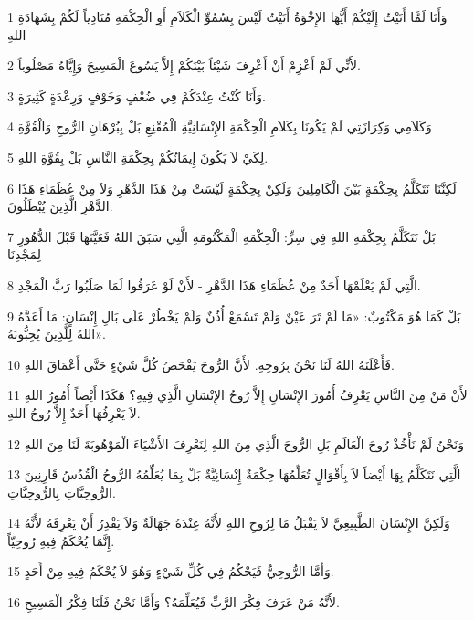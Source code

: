 \par 1 وَأَنَا لَمَّا أَتَيْتُ إِلَيْكُمْ أَيُّهَا الإِخْوَةُ أَتَيْتُ لَيْسَ بِسُمُوِّ الْكَلاَمِ أَوِ الْحِكْمَةِ مُنَادِياً لَكُمْ بِشَهَادَةِ اللهِ
\par 2 لأَنِّي لَمْ أَعْزِمْ أَنْ أَعْرِفَ شَيْئاً بَيْنَكُمْ إِلاَّ يَسُوعَ الْمَسِيحَ وَإِيَّاهُ مَصْلُوباً.
\par 3 وَأَنَا كُنْتُ عِنْدَكُمْ فِي ضُعْفٍ وَخَوْفٍ وَرِعْدَةٍ كَثِيرَةٍ.
\par 4 وَكَلاَمِي وَكِرَازَتِي لَمْ يَكُونَا بِكَلاَمِ الْحِكْمَةِ الإِنْسَانِيَّةِ الْمُقْنِعِ بَلْ بِبُرْهَانِ الرُّوحِ وَالْقُوَّةِ
\par 5 لِكَيْ لاَ يَكُونَ إِيمَانُكُمْ بِحِكْمَةِ النَّاسِ بَلْ بِقُوَّةِ اللهِ.
\par 6 لَكِنَّنَا نَتَكَلَّمُ بِحِكْمَةٍ بَيْنَ الْكَامِلِينَ وَلَكِنْ بِحِكْمَةٍ لَيْسَتْ مِنْ هَذَا الدَّهْرِ وَلاَ مِنْ عُظَمَاءِ هَذَا الدَّهْرِ الَّذِينَ يُبْطَلُونَ.
\par 7 بَلْ نَتَكَلَّمُ بِحِكْمَةِ اللهِ فِي سِرٍّ: الْحِكْمَةِ الْمَكْتُومَةِ الَّتِي سَبَقَ اللهُ فَعَيَّنَهَا قَبْلَ الدُّهُورِ لِمَجْدِنَا
\par 8 الَّتِي لَمْ يَعْلَمْهَا أَحَدٌ مِنْ عُظَمَاءِ هَذَا الدَّهْرِ - لأَنْ لَوْ عَرَفُوا لَمَا صَلَبُوا رَبَّ الْمَجْدِ.
\par 9 بَلْ كَمَا هُوَ مَكْتُوبٌ: «مَا لَمْ تَرَ عَيْنٌ وَلَمْ تَسْمَعْ أُذُنٌ وَلَمْ يَخْطُرْ عَلَى بَالِ إِنْسَانٍ: مَا أَعَدَّهُ اللهُ لِلَّذِينَ يُحِبُّونَهُ».
\par 10 فَأَعْلَنَهُ اللهُ لَنَا نَحْنُ بِرُوحِهِ. لأَنَّ الرُّوحَ يَفْحَصُ كُلَّ شَيْءٍ حَتَّى أَعْمَاقَ اللهِ.
\par 11 لأَنْ مَنْ مِنَ النَّاسِ يَعْرِفُ أُمُورَ الإِنْسَانِ إِلاَّ رُوحُ الإِنْسَانِ الَّذِي فِيهِ؟ هَكَذَا أَيْضاً أُمُورُ اللهِ لاَ يَعْرِفُهَا أَحَدٌ إِلاَّ رُوحُ اللهِ.
\par 12 وَنَحْنُ لَمْ نَأْخُذْ رُوحَ الْعَالَمِ بَلِ الرُّوحَ الَّذِي مِنَ اللهِ لِنَعْرِفَ الأَشْيَاءَ الْمَوْهُوبَةَ لَنَا مِنَ اللهِ
\par 13 الَّتِي نَتَكَلَّمُ بِهَا أَيْضاً لاَ بِأَقْوَالٍ تُعَلِّمُهَا حِكْمَةٌ إِنْسَانِيَّةٌ بَلْ بِمَا يُعَلِّمُهُ الرُّوحُ الْقُدُسُ قَارِنِينَ الرُّوحِيَّاتِ بِالرُّوحِيَّاتِ.
\par 14 وَلَكِنَّ الإِنْسَانَ الطَّبِيعِيَّ لاَ يَقْبَلُ مَا لِرُوحِ اللهِ لأَنَّهُ عِنْدَهُ جَهَالَةٌ وَلاَ يَقْدِرُ أَنْ يَعْرِفَهُ لأَنَّهُ إِنَّمَا يُحْكَمُ فِيهِ رُوحِيّاً.
\par 15 وَأَمَّا الرُّوحِيُّ فَيَحْكُمُ فِي كُلِّ شَيْءٍ وَهُوَ لاَ يُحْكَمُ فِيهِ مِنْ أَحَدٍ.
\par 16 لأَنَّهُ مَنْ عَرَفَ فِكْرَ الرَّبِّ فَيُعَلِّمَهُ؟ وَأَمَّا نَحْنُ فَلَنَا فِكْرُ الْمَسِيحِ.


